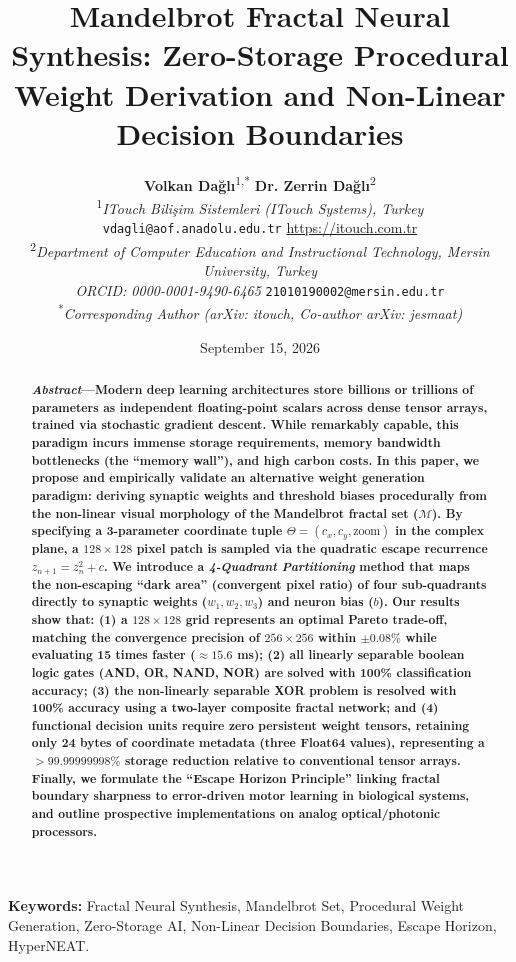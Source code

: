 \documentclass[10pt,journal,compsoc,twocolumn]{article}
\title{\textbf{\Large Mandelbrot Fractal Neural Synthesis: Zero-Storage Procedural Weight Derivation and Non-Linear Decision Boundaries}}
\author{
    \textbf{Volkan Dağlı}\textsuperscript{1,*} \quad \textbf{Dr. Zerrin Dağlı}\textsuperscript{2} \\
    \textsuperscript{1}\textit{ITouch Bilişim Sistemleri (ITouch Systems), Turkey} \\
    \texttt{vdagli@aof.anadolu.edu.tr} \quad \url{https://itouch.com.tr} \\
    \textsuperscript{2}\textit{Department of Computer Education and Instructional Technology, Mersin University, Turkey} \\
    \textit{ORCID: 0000-0001-9490-6465} \quad \texttt{21010190002@mersin.edu.tr} \\
    \textsuperscript{*}\textit{Corresponding Author (arXiv: itouch, Co-author arXiv: jesmaat)}
}
\date{September 15, 2026}
\begin{document}
\maketitle

\begin{abstract}
\textbf{\textit{Abstract}---Modern deep learning architectures store billions or trillions of parameters as independent floating-point scalars across dense tensor arrays, trained via stochastic gradient descent. While remarkably capable, this paradigm incurs immense storage requirements, memory bandwidth bottlenecks (the ``memory wall''), and high carbon costs. In this paper, we propose and empirically validate an alternative weight generation paradigm: deriving synaptic weights and threshold biases procedurally from the non-linear visual morphology of the Mandelbrot fractal set ($\mathcal{M}$). By specifying a 3-parameter coordinate tuple $\Theta = (c_x, c_y, \text{zoom})$ in the complex plane, a $128 \times 128$ pixel patch is sampled via the quadratic escape recurrence $z_{n+1} = z_n^2 + c$. We introduce a \textit{4-Quadrant Partitioning} method that maps the non-escaping ``dark area'' (convergent pixel ratio) of four sub-quadrants directly to synaptic weights ($w_1, w_2, w_3$) and neuron bias ($b$). Our results show that: (1) a $128 \times 128$ grid represents an optimal Pareto trade-off, matching the convergence precision of $256 \times 256$ within $\pm 0.08\%$ while evaluating 15 times faster ($\approx 15.6$ ms); (2) all linearly separable boolean logic gates (AND, OR, NAND, NOR) are solved with 100\% classification accuracy; (3) the non-linearly separable XOR problem is resolved with 100\% accuracy using a two-layer composite fractal network; and (4) functional decision units require zero persistent weight tensors, retaining only 24 bytes of coordinate metadata (three Float64 values), representing a $>99.99999998\%$ storage reduction relative to conventional tensor arrays. Finally, we formulate the ``Escape Horizon Principle'' linking fractal boundary sharpness to error-driven motor learning in biological systems, and outline prospective implementations on analog optical/photonic processors.}
\end{abstract}

\vspace{0.2cm}
\noindent\textbf{Keywords:} Fractal Neural Synthesis, Mandelbrot Set, Procedural Weight Generation, Zero-Storage AI, Non-Linear Decision Boundaries, Escape Horizon, HyperNEAT.

\end{document}
